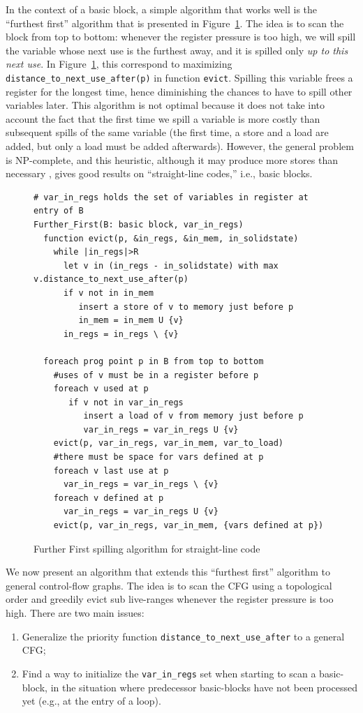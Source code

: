 {In the context of a basic block, a simple algorithm that works well is the ``furthest first'' algorithm that is presented in Figure~\ref{fig:ra:ff}.
The idea is to scan the block from top to bottom:
whenever the register pressure is too high, we will spill the variable whose next use is the furthest away, and it is spilled only \emph{up to this next use}.
In Figure~\ref{fig:ra:ff}, this correspond to maximizing \verb+distance_to_next_use_after(p)+ in function \verb+evict+.
%
Spilling this variable frees a register for the longest time, hence diminishing the chances to have to spill other variables later.
This algorithm is not optimal because it does not take into account the fact that the first time we spill a variable is more costly than subsequent spills of the same variable (the first time, a store and a load are added, but only a load must be added afterwards).
However, the general problem is NP-complete, and this heuristic, although it may produce more stores than necessary%
, gives good results on ``straight-line codes,'' i.e., basic blocks.

\begin{figure}
\begin{verbatim}
# var_in_regs holds the set of variables in register at entry of B
Further_First(B: basic block, var_in_regs)
  function evict(p, &in_regs, &in_mem, in_solidstate)
    while |in_regs|>R
      let v in (in_regs - in_solidstate) with max v.distance_to_next_use_after(p)
      if v not in in_mem 
         insert a store of v to memory just before p
         in_mem = in_mem U {v}
      in_regs = in_regs \ {v}

  foreach prog point p in B from top to bottom
    #uses of v must be in a register before p
    foreach v used at p
       if v not in var_in_regs 
          insert a load of v from memory just before p
          var_in_regs = var_in_regs U {v}
    evict(p, var_in_regs, var_in_mem, var_to_load)
    #there must be space for vars defined at p
    foreach v last use at p  
      var_in_regs = var_in_regs \ {v}
    foreach v defined at p
      var_in_regs = var_in_regs U {v}
    evict(p, var_in_regs, var_in_mem, {vars defined at p})
\end{verbatim}
\caption{\label{fig:ra:ff}Further First spilling algorithm for straight-line code}
\end{figure}

We now present an algorithm that extends this ``furthest first'' algorithm to general control-flow graphs.
The idea is to scan the CFG using a topological order and greedily evict sub live-ranges whenever the register pressure is too high.
There are two main issues:
\begin{enumerate}
  \item Generalize the priority function \verb+distance_to_next_use_after+ to a general CFG;
  \item Find a way to initialize the \verb+var_in_regs+ set when starting to scan a basic-block, in the situation where predecessor basic-blocks have not been processed yet (e.g., at the entry of a loop).
\end{enumerate}


}
